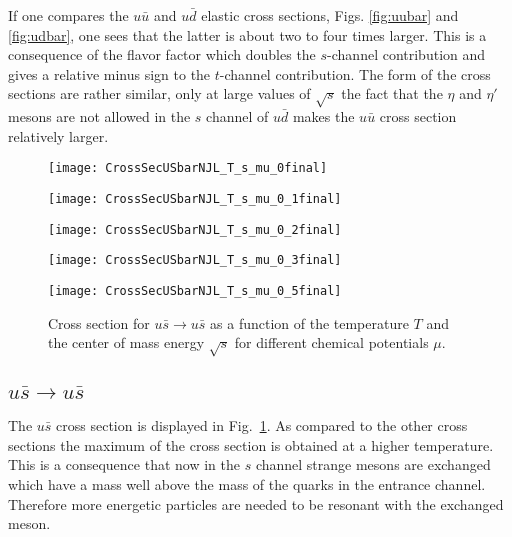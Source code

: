 \documentclass[a4paper]{jpconf}
\begin{document}
If one compares the $u\bar u$ and $u\bar d$ elastic cross sections, Figs. \ref{fig:uubar} and  \ref{fig:udbar}, one sees that the latter is about two to four times larger. This is a consequence of the flavor factor 
which doubles the $s$-channel contribution and gives a relative minus sign to the $t$-channel contribution. The form of the cross sections are rather similar, only at large values of $\sqrt{s}$ the fact that the $\eta$ and
$\eta'$ mesons are not allowed in the $s$ channel of $u\bar d$ makes the $u\bar u$ cross section relatively larger.  
\begin{figure}[htp]%
\centering
\begin{minipage}{0.49\textwidth}
\centering
\texttt{[image: CrossSecUSbarNJL\_T\_s\_mu\_0final]}
\end{minipage}
\hfill
\begin{minipage}{0.49\textwidth}
\texttt{[image: CrossSecUSbarNJL\_T\_s\_mu\_0\_1final]}
\end{minipage}
\hfill
\begin{minipage}{0.49\textwidth}
\texttt{[image: CrossSecUSbarNJL\_T\_s\_mu\_0\_2final]}
\end{minipage}
\hfill
\begin{minipage}{0.49\textwidth}
\texttt{[image: CrossSecUSbarNJL\_T\_s\_mu\_0\_3final]}
\end{minipage}
\hfill
\begin{minipage}{0.49\textwidth}
\texttt{[image: CrossSecUSbarNJL\_T\_s\_mu\_0\_5final]}
\end{minipage}
\hfill
\caption{\label{fig:usbar}Cross section for $u\bar{s} \rightarrow u\bar{s}$ as a function of the temperature $T$ and the center of mass energy  $\sqrt{s}$ for different chemical potentials $\mu$.}
\end{figure}
\subsection{$u\bar{s} \rightarrow u\bar{s}$ }
The  $u\bar{s}$ cross section is displayed in Fig.~\ref{fig:usbar}. As compared to the other cross sections the maximum of the cross section is obtained at a higher temperature. This is a consequence that now in the
$s$ channel strange mesons are exchanged which have a mass well above the mass of the quarks in the entrance channel. Therefore more energetic particles are needed to be resonant with the exchanged meson.
\end{document}

